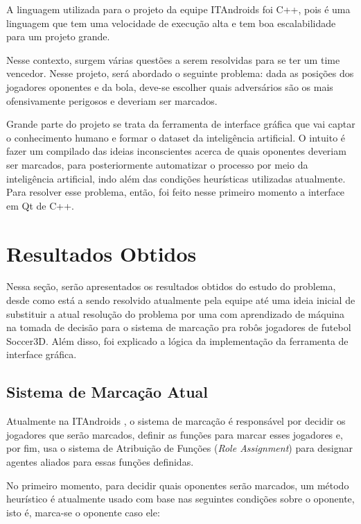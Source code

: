 \documentclass[a4paper,12pt]{article}
\begin{document}
A linguagem utilizada para o projeto da equipe ITAndroids foi C++, pois é uma linguagem que tem uma velocidade de execução alta e tem boa escalabilidade para um projeto grande.

Nesse contexto, surgem várias questões a serem resolvidas para se ter um time vencedor. Nesse projeto, será abordado o seguinte problema: dada as posições dos jogadores oponentes e da bola, deve-se escolher quais adversários são os mais ofensivamente perigosos e deveriam ser marcados.

Grande parte do projeto se trata da ferramenta de interface gráfica que vai captar o conhecimento humano e formar o dataset da inteligência artificial. O intuito é fazer um compilado das ideias inconscientes acerca de quais oponentes deveriam ser marcados, para posteriormente automatizar o processo por meio da inteligência artificial, indo além das condições heurísticas utilizadas atualmente. Para resolver esse problema, então, foi feito nesse primeiro momento a interface em Qt de C++.

\section{Resultados Obtidos}
\label{resultados-obtidos}

Nessa seção, serão apresentados os resultados obtidos do estudo do problema, desde como está a sendo resolvido atualmente pela equipe até uma ideia inicial de substituir a atual resolução do problema por uma com aprendizado de máquina na tomada de decisão para o sistema de marcação pra robôs jogadores de futebol Soccer3D. Além disso, foi explicado a lógica da implementação da ferramenta de interface gráfica.

\subsection{Sistema de Marcação Atual}

Atualmente na ITAndroids \cite{soccer3d-tdp-2019}, o sistema de marcação é responsável por decidir os jogadores que serão marcados, definir as funções para marcar esses jogadores e, por fim, usa o sistema de Atribuição de Funções (\textit{Role Assignment}) para designar agentes aliados para essas funções definidas.

No primeiro momento, para decidir quais oponentes serão marcados, um método heurístico é atualmente usado com base nas seguintes condições sobre o oponente, isto é, marca-se o oponente caso ele:
\end{document}
